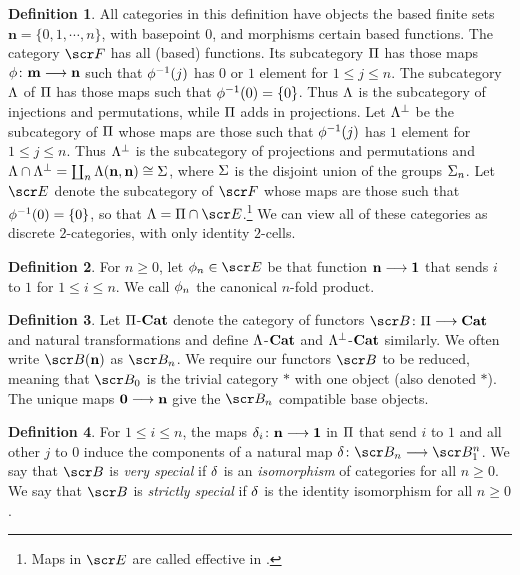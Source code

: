 \documentclass{amsart}
\theoremstyle{definition}
\newtheorem{defn}{Definition}[section]
\numberwithin{equation}{section}
\newcommand{\bm}{\mathbf{m}}
\newcommand{\bn}{\mathbf{n}}
\begin{document}
\begin{defn}\label{Fetal}  All categories in this definition have objects the based finite sets $\bn = \{0, 1, \cdots, n\}$, with basepoint $0$, and morphisms certain based functions.  The category $\sF$ has all (based) functions. Its subcategory $\Pi$ has those maps 
$\ph\colon \bm \rtarr \bn$ such that $\phi^{-1}(j)$ has $0$ or $1$ element for $1\leq j\leq n$.   The subcategory  $\Lambda$ of $\Pi$ has 
those maps such that $\phi^{-1}(0) = \{0\}$.  Thus $\Lambda$ is the subcategory of injections and permutations, while $\Pi$ adds in projections.  Let $\Lambda^{\perp}$ be the subcategory of $\Pi$ whose maps are those such that $\phi^{-1}(j)$ has $1$ element for $1\leq j\leq n$.  Thus $\Lambda^{\perp}$ is the subcategory of projections and permutations and $\LA\cap \LA^{\perp} = \coprod_n \LA(\bn,\bn) \iso \SI$, where $\Sigma$ is the disjoint union of the groups $\Sigma_n$.  Let $\sE$ denote  the subcategory of $\sF$ whose maps are  those such that $\phi^{-1}(0) = \{0\}$, so that  $\LA = \PI \cap \sE$.\footnote{Maps in $\sE$ are called effective in \cite[Notations 5.2]{MT}.}  We can view all of these categories as discrete $2$-categories, with only identity $2$-cells.
\end{defn}

\begin{defn} For $n\geq 0$, let $\ph_n\in \sE$  be that function $\bn \rtarr \mathbf{1}$ that sends $i$ to $1$ for $1\leq i\leq n$.  We call $\phi_n$ the canonical $n$-fold product.
\end{defn}

\begin{defn} Let $\Pi$-$\bf{Cat}$ denote the category of functors $\sB\colon \PI \rtarr \bf{Cat}$ and natural transformations and define $\Lambda$-$\bf{Cat}$ and
$\Lambda^{\perp}$-$\bf{Cat}$ similarly.  We often write $\sB(\bf{n})$ as $\sB_n$.  We require our functors $\sB$ to be reduced, meaning that $\sB_0$ is the trivial category $\mathbf{\ast}$ with one object (also denoted $\ast$).  The unique maps $\mathbf{0} \rtarr \bn$ give the $\sB_n$ compatible base objects.  
\end{defn}

\begin{defn}\label{PIspec} For $1\leq i\leq n$, the maps $\de_i\colon \bn \rtarr \mathbf{1}$ in $\Pi$ that send $i$ to $1$  and all other $j$ to $0$ induce the components of a natural map $\de\colon \sB_n \rtarr \sB_1^{n}$. We say that $\sB$ is {\em{very special}} if $\delta$ is an {\em{isomorphism}} of  categories for all $n\geq 0$.  We say that $\sB$ is {\em{strictly special}} if $\delta$ is the identity isomorphism for all $n\geq 0$.
\end{defn}
\end{document}
